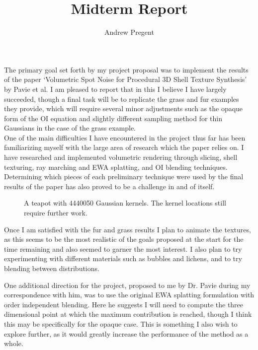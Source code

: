 \documentclass{article}
\author{Andrew Pregent}
\date{}
\title{\vspace{-2cm}Midterm Report}
\begin{document}
\maketitle{}
The primary goal set forth by my project proposal was to implement the results of the paper `Volumetric Spot Noise for Procedural 3D Shell Texture Synthesis' by Pavie et al.\cite{pavie:hal-02413269} I am pleased to report that in this I believe I have largely succeeded, though a final task will be to replicate the grass and fur examples they provide, which will require several minor adjustments such as the opaque form of the OI equation and slightly different sampling method for thin Gaussians in the case of the grass example. \\

One of the main difficulties I have encountered in the project thus far has been familiarizing myself with the large area of research which the paper relies on. I have researched and implemented volumetric rendering through slicing, shell texturing, ray marching and EWA splatting, and OI blending techniques. Determining which pieces of each preliminary technique were used by the final results of the paper has also proved to be a challenge in and of itself.

\begin{figure}[h!]
\caption{A teapot with 4440050 Gaussian kernels. The kernel locations still require further work.}
\end{figure}

Once I am satisfied with the fur and grass results I plan to animate the textures, as this seems to be the most realistic of the goals proposed at the start for the time remaining and also seemed to garner the most interest. I also plan to try experimenting with different materials such as bubbles and lichens, and to try blending between distributions.

One additional direction for the project, proposed to me by Dr. Pavie during my correspondence with him, was to use the original EWA splatting formulation with order independent blending. Here he suggests I will need to compute the three dimensional point at which the maximum contribution is reached, though I think this may be specifically for the opaque case. This is something I also wish to explore further, as it would greatly increase the performance of the method as a whole.

\printbibliography
\end{document}
